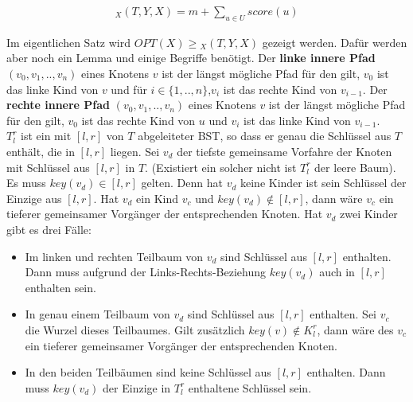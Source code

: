 \documentclass[a4paper,12pt]{article}
\begin{document}
\begin{align*}
_X(T, Y, X)  = m + \sum_{u \in U} {\mathit{score}} \left(u\right)
\end{align*} %

\noindent Im eigentlichen Satz wird $\mathit{OPT}\left(X\right) \geq {_X(T, Y, X)} $ gezeigt werden. Dafür werden aber noch ein Lemma und einige Begriffe benötigt. Der \textbf{linke innere Pfad} $\left(v_0,v_1,..,v_n \right)$ eines Knotens $v$ ist der längst mögliche Pfad für den gilt, $v_0$ ist das linke Kind von $v$ und für $i \in \{1,..,n\}$,$v_i$ ist das rechte Kind von $v_{i-1}$. Der \textbf{rechte innere Pfad} $\left(v_0,v_1,..,v_n \right)$ eines Knotens $v$ ist der längst mögliche Pfad für den gilt, $v_0$ ist das rechte Kind von $u$ und $v_i$ ist das linke Kind von $v_{i-1}$.\\ $T^r_l$ ist ein mit $\left[l,r\right]$ von $T$ abgeleiteter BST, so dass er genau die Schlüssel aus $T$ enthält, die in $\left[l, r\right]$ liegen. Sei $v_d$ der tiefste gemeinsame Vorfahre der Knoten mit Schlüssel aus  $\left[l,r\right]$ in $T$. (Existiert ein solcher nicht ist $T^r_l$ der leere Baum). Es muss $\mathit{key}(v_d) \in \left[l,r\right]$ gelten. Denn hat $v_d$ keine Kinder ist sein Schlüssel der Einzige aus $\left[l,r\right]$. Hat $v_d$ ein Kind $v_{c}$ und $\mathit{key}(v_d) \notin \left[l,r\right]$, dann wäre $v_{c}$ ein tieferer gemeinsamer Vorgänger der entsprechenden Knoten. Hat $v_d$ zwei Kinder gibt es drei Fälle:
\begin{itemize}
	\item Im linken und rechten Teilbaum von $v_d$ sind Schlüssel aus $\left[l,r\right]$ enthalten. Dann muss aufgrund der Links-Rechts-Beziehung  $\mathit{key}(v_d)$ auch in $\left[l,r\right]$ enthalten sein.
	\item In genau einem Teilbaum von $v_d$ sind Schlüssel aus $\left[l,r\right]$ enthalten. Sei $v_{c}$ die Wurzel dieses Teilbaumes. Gilt zusätzlich $\mathit{key}(v) \notin K^r_l$, dann wäre des  $v_c$ ein tieferer gemeinsamer Vorgänger der entsprechenden Knoten.
	\item In den beiden Teilbäumen sind keine Schlüssel aus $\left[l,r\right]$ enthalten.  Dann muss $\mathit{key}(v_d)$ der Einzige in $T^r_l$ enthaltene Schlüssel sein.
\end{itemize}
\end{document}

